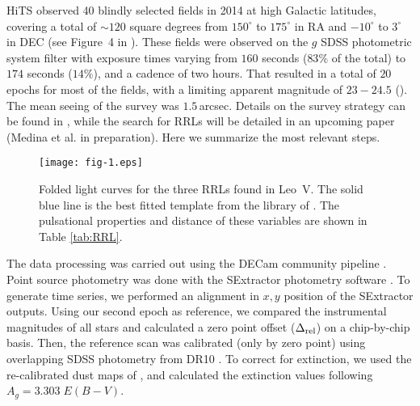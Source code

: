\documentclass[iop]{emulateapj}
\begin{document}
HiTS observed 40 blindly selected fields in 2014 at high Galactic latitudes, covering a total of $\sim 120$ square degrees from $150^{\circ}$ to $175^{\circ}$ in RA and $-10^{\circ}$ to $3^{\circ}$ in DEC (see Figure~4 in \citeauthor*{forster16a}). 
These fields were observed on the $g$ SDSS photometric system filter with exposure times varying from $160$ seconds ($83\%$ of the total) to $174$ seconds ($14\%$), and a cadence of two hours. 
That resulted in a total of $20$ epochs for most of the fields, with a limiting apparent magnitude of $23-24.5$ (\citeauthor*{forster16a}). 
The mean seeing of the survey was $1.5$\,arcsec. 
Details on the survey strategy can be found in \citeauthor*{forster16a}, while the search for RRLs will be detailed in an upcoming paper (Medina et al. in preparation). 
Here we summarize the most relevant steps.

\begin{figure}
\texttt{[image: fig-1.eps]}
\caption{Folded light curves for the three RRLs found in Leo~V. The solid blue line is the best fitted template from the library of \citet{Sesar2010}. 
The pulsational properties and distance of these variables are shown in Table \ref{tab:RRL}.}
\label{fig:lc}
\end{figure}

The data processing was carried out using the DECam community pipeline \citep{Valdes2014}. 
Point source photometry was done with the SExtractor photometry software \citep{Bert96}. 
To generate time series, we performed an alignment in $x,y$ position of the SExtractor outputs. 
Using our second epoch as reference, we compared the instrumental magnitudes of all stars and calculated a zero point offset ($\Delta_{\rm rel}$) on a chip-by-chip basis.
Then, the reference scan was calibrated (only by zero point) using overlapping SDSS photometry from DR10 \citep{Ahn2014}. 
To correct for extinction, we used the re-calibrated dust maps of \citet{Sch11}, and calculated the extinction values following $A_g = 3.303 \; E(B-V)$.
\end{document}
